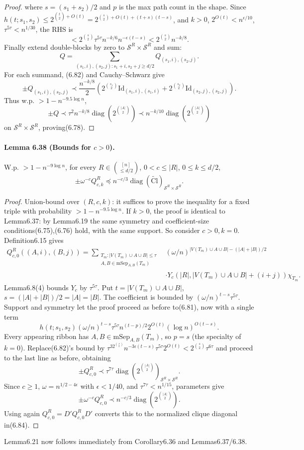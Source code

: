 \begin{proof}
where $s=(s_1+s_2)/2$ and $p$ is the max path count in the shape. Since $h(t;s_1,s_2)\le2^{\binom t2+O(t)}=2^{\binom s2+O(t)+(t+s)(t-s)}$, and $k>0$, $2^{O(t)}<n^{\epsilon/10}$, $\tau^{5\tau}<n^{1/30}$, the RHS is
\[<2^{\binom s2}\tau^{5\tau}n^{-k/6}n^{-\epsilon(t-s)}<2^{\binom s2}n^{-k/8}.\tag{6.82}\]
Finally extend double-blocks by zero to $\mathcal S^R\times\mathcal S^R$ and sum:
\[Q=\sum_{(s_1,i),(s_2,j):s_1+i,s_2+j\ge d/2}Q_{(s_1,i),(s_2,j)}.\tag{6.83}\]
For each summand, (6.82) and Cauchy--Schwarz give
\[\pm Q_{(s_1,i),(s_2,j)}\prec\frac{n^{-k/8}}2\left(2^{\binom{s_1}2}\mathrm{Id}_{(s_1,i),(s_1,i)}+2^{\binom{s_2}2}\mathrm{Id}_{(s_2,j),(s_2,j)}\right).\]
Thus w.p. $>1-n^{-9.5\log n}$,
\[\pm Q\prec\tau^2n^{-k/8}\operatorname{diag}(2^{\binom{|A|}2})\prec n^{-k/10}\operatorname{diag}(2^{\binom{|A|}2})\]
on $\mathcal S^R\times\mathcal S^R$, proving(6.78).\end{proof}
\paragraph{Lemma 6.38 (Bounds for $c>0$).} W.p. $>1-n^{-9\log n}$, for every $R\in\binom{[n]}{\le d/2}$, $0<c\le|R|$, $0\le k\le d/2$,
\[\pm\omega^{-c}Q_{c,k}^R\preceq n^{-c/3}\operatorname{diag}(\widetilde{\mathrm{Cl}})_{\mathcal S^R\times\mathcal S^R}.\tag{6.84}\]
\begin{proof}Union-bound over $(R,c,k)$: it suffices to prove the inequality for a fixed triple with probability $>1-n^{-9.5\log n}$. If $k>0$, the proof is identical to Lemma6.37: by Lemma6.19 the same symmetry and coefficient-size conditions(6.75),(6.76) hold, with the same support. So consider $c>0,k=0$. Definition6.15 gives
\begin{align*}Q_{c,0}^R((A,i),(B,j))=\sum_{\substack{T_m:|V(T_m)\cup A\cup B|\le\tau\\A,B\in\mathrm{mSep}_{A,B}(T_m)}}&(\omega/n)^{|V(T_m)\cup A\cup B|-(|A|+|B|)/2}\\&\cdot Y_c(|R|,|V(T_m)\cup A\cup B|+(i+j))\chi_{T_m}.\tag{6.85}\end{align*}
Lemma6.8(4) bounds $Y_c$ by $\tau^{5\tau}$. Put $t=|V(T_m)\cup A\cup B|$, $s=(|A|+|B|)/2=|A|=|B|$. The coefficient is bounded by $(\omega/n)^{t-s}\tau^{5\tau}$. Support and symmetry let the proof proceed as before to(6.81), now with a single term
\[h(t;s_1,s_2)(\omega/n)^{t-s}\tau^{5\tau}n^{(t-p)/2}2^{O(t)}(\log n)^{O(t-s)}.\]
Every appearing ribbon has $A,B\in\mathrm{mSep}_{A,B}(T_m)$, so $p=s$ (the specialty of $k=0$). Replace(6.82)'s bound by $\tau^32^{\binom s2}n^{-3\epsilon(t-s)}\tau^{5\tau}2^{O(t)}<2^{\binom s2}\tau^{6\tau}$ and proceed to the last line as before, obtaining
\[\pm Q_{c,0}^R\prec\tau^{7\tau}\operatorname{diag}(2^{\binom{|A|}2})_{\mathcal S^R\times\mathcal S^R}.\]
Since $c\ge1$, $\omega=n^{1/2-4\epsilon}$ with $\epsilon<1/40$, and $\tau^{7\tau}<n^{1/15}$, parameters give
\[\pm\omega^{-c}Q_{c,0}^R\prec n^{-c/3}\operatorname{diag}(2^{\binom{|A|}2}).\]
Using again $Q_{c,0}^R=D'Q_{c,0}^RD'$ converts this to the normalized clique diagonal in(6.84).\end{proof}
Lemma6.21 now follows immediately from Corollary6.36 and Lemmas6.37/6.38.
